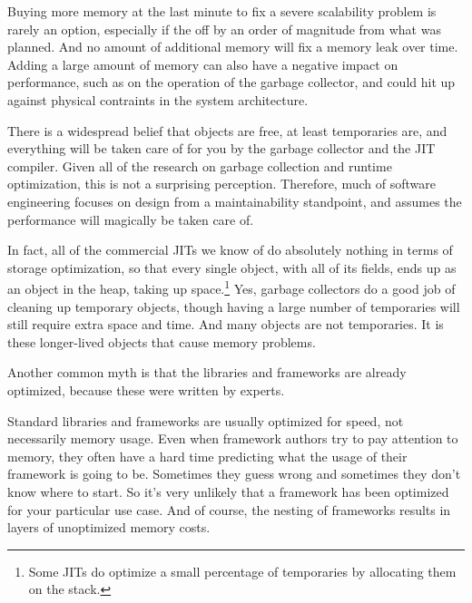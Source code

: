 Buying more memory at the last minute to fix a severe scalability problem is rarely an option, especially
if the off by an order of magnitude from what was planned.  And no
amount of additional memory will fix a memory leak over time. Adding a large amount of memory can also have
a negative impact on performance, such as on the operation of the garbage collector, and could hit up against physical
contraints in the system architecture.


There is a widespread belief that objects are free, at least temporaries are, 
and everything will be taken care of for you by the garbage collector and the JIT compiler.
Given all of the research on garbage collection and runtime optimization, this
is not a surprising perception. Therefore, much of software engineering focuses on
design from a maintainability standpoint, and assumes the performance will
magically be taken care of.

In fact, all of the commercial JITs
we know of do absolutely nothing in terms of storage optimization, so
that every single object, with all of its fields, ends up as an object in the
heap, taking up space.\footnote{Some JITs do optimize a
small percentage of temporaries by allocating them on the stack.} 
Yes, garbage collectors do a good job of cleaning up temporary objects, though having a large number of
temporaries will still require extra space and time. And many objects are not
temporaries. It is these longer-lived objects that cause memory problems. 


{Another common myth is that the libraries and frameworks are already optimized,
because these were written by experts.
} 

Standard libraries and frameworks are usually optimized for speed, not
necessarily memory usage. Even when framework authors try to pay attention to
memory, they often have a hard time predicting what the usage of their
framework is going to be. Sometimes they guess wrong and sometimes they don't
know where to start.  So it's very unlikely that a framework has been optimized for
your particular use case.  And of course, the nesting of frameworks results in
layers of unoptimized memory costs.

